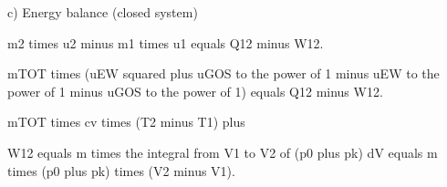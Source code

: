 c) Energy balance (closed system)

m2 times u2 minus m1 times u1 equals Q12 minus W12.

mTOT times (uEW squared plus uGOS to the power of 1 minus uEW to the power of 1 minus uGOS to the power of 1) equals Q12 minus W12.

mTOT times cv times (T2 minus T1) plus

W12 equals m times the integral from V1 to V2 of (p0 plus pk) dV equals m times (p0 plus pk) times (V2 minus V1).
